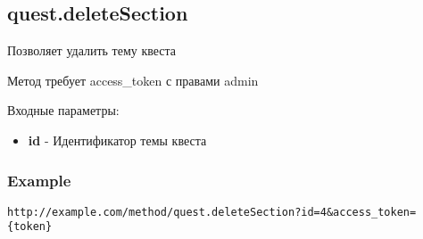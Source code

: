 \subsection{quest.deleteSection}

Позволяет удалить тему квеста

Метод требует access\_token с правами admin

Входные параметры:
\begin{itemize}
  \item \textbf{id} - Идентификатор темы квеста
\end{itemize}

\subsubsection{Example}
\begin{Verbatim}[frame=single]
http://example.com/method/quest.deleteSection?id=4&access_token={token}
\end{Verbatim}